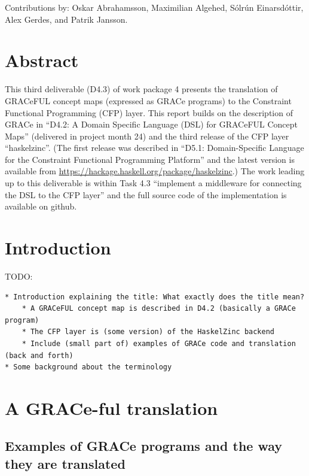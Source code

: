 \documentclass{article}
\begin{document}
Contributions by: Oskar Abrahamsson, Maximilian Algehed, Sólrún
Einarsdóttir, Alex Gerdes, and Patrik Jansson.

\vfill

\setcounter{tocdepth}{2}
\tableofcontents

\vfill

\newpage

\section*{Abstract}\label{abstract}

This third deliverable (D4.3) of work package 4 presents the
translation of GRACeFUL concept maps (expressed as GRACe programs) to
the Constraint Functional Programming (CFP) layer.
%
This report builds on the description of GRACe in ``D4.2: A Domain
Specific Language (DSL) for GRACeFUL Concept Maps'' (delivered in
project month 24) and the third release of the CFP layer ``haskelzinc''.
%
(The first release was described in ``D5.1: Domain-Specific Language
for the Constraint Functional Programming Platform'' and the latest
version is available from
\url{https://hackage.haskell.org/package/haskelzinc}.)
%
The work leading up to this deliverable is within Task 4.3 ``implement
a middleware for connecting the DSL to the CFP layer'' and the full
source code of the implementation is available on github.


\section{Introduction}


TODO:
\begin{verbatim}
* Introduction explaining the title: What exactly does the title mean?
    * A GRACeFUL concept map is described in D4.2 (basically a GRACe program)
    * The CFP layer is (some version) of the HaskelZinc backend
    * Include (small part of) examples of GRACe code and translation (back and forth)
* Some background about the terminology
\end{verbatim}

\section{A GRACe-ful translation}

\subsection{Examples of GRACe programs and the way they are translated}
\end{document}
